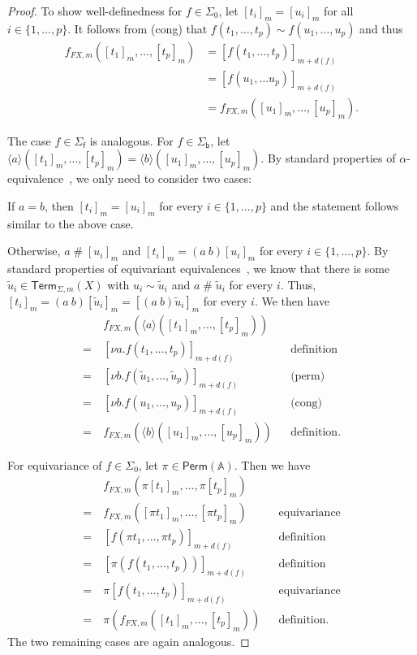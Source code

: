 \documentclass[11pt,a4paper]{amsart}
\newcommand{\Perm}{\mathsf{Perm}(\Names)}
\newcommand{\Term}{\mathsf{Term}}
\newcommand{\sig}{\Sigma}
\newcommand{\sigp}{\Sigma_0}
\newcommand{\sigf}{\Sigma_{\mathsf f}}
\newcommand{\sigb}{\Sigma_{\mathsf b}}
\newcommand{\Names}{\mathbb{A}}
\newcommand{\fresh}{\mathbin{\#}}
\theoremstyle{plain}
\numberwithin{equation}{section}
\newcommand{\+}[1]{\mathcal{#1}\xspace}
\theoremstyle{definition}
\begin{document}
\begin{proof}
    To show well-definedness for \(f \in \sigp\), let \([t_i]_m = [u_i]_m\) for all \(i \in \{1, \ldots, p\}\).
    It follows from (cong) that \(f(t_1, \ldots, t_p) \sim f(u_1, \ldots, u_p)\) and thus
    \begin{align*}
        f_{FX, m}([t_1]_m, \ldots, [t_p]_m)
        &= [f(t_1, \ldots, t_p)]_{m + d(f)} \\
        &= [f(u_1, \ldots u_p)]_{m + d(f)} \\
        &= f_{FX, m}([u_1]_m, \ldots, [u_p]_m).
    \end{align*}

    The case \(f \in \sigf\) is analogous. For \(f \in \sigb\), let
    \(\langle a \rangle ([t_1]_m, \ldots, [t_p]_m) = \langle b
    \rangle ([u_1]_m, \ldots, [u_p]_m)\).  By standard
    properties of $\alpha$-equivalence~\cite{Pitts13}, we only
    need to consider two cases:

    If \(a = b\), then \([t_i]_m = [u_i]_m\) for every \(i \in \{1, \ldots, p\}\) and the statement follows similar to the above case.

    Otherwise, \(a \fresh [u_i]_m\) and \([t_i]_m = (a\ b)[u_i]_m\) for every \(i \in \{1, \ldots, p\}\).
    By standard properties of equivariant equivalences~\cite{Pitts13}, we know that there is some \(\tilde{u}_i \in \Term_{\sig, m}(X)\) with \(u_i \sim \tilde{u}_i\) and \(a \fresh \tilde{u}_i\) for every \(i\).
    Thus, \([t_i]_m = (a\ b)[\tilde{u}_i]_m = [(a\ b)\tilde{u}_i]_m\) for every \(i\).
    We then have
    \begin{align*}
        &f_{FX, m}(\langle a \rangle ([t_1]_m, \ldots, [t_p]_m)) \\
        =~&[\nu a.f(t_1, \ldots, t_p)]_{m + d(f)} && \text{definition} \\
        =~&[\nu b.f(\tilde{u}_1, \ldots, \tilde{u}_p)]_{m + d(f)} && \text{(perm)} \\
        =~&[\nu b.f(u_1, \ldots, u_p)]_{m + d(f)} && \text{(cong)} \\
        =~&f_{FX, m}(\langle b \rangle ([u_1]_m, \ldots, [u_p]_m)) && \text{definition}.
    \end{align*}

    For equivariance of \(f \in \sigp\), let \(\pi \in \Perm\).
    Then we have
    \begin{align*}
        &f_{FX, m}(\pi[t_1]_m, \ldots, \pi[t_p]_m) \\
        =~&f_{FX, m}([\pi t_1]_m, \ldots, [\pi t_p]_m) && \text{equivariance} \\
        =~&[f(\pi t_1, \ldots, \pi t_p)]_{m + d(f)} && \text{definition} \\
        =~&[\pi(f(t_1, \ldots, t_p))]_{m + d(f)} && \text{definition} \\
        =~&\pi[f(t_1, \ldots, t_p)]_{m + d(f)} && \text{equivariance} \\
        =~&\pi(f_{FX, m}([t_1]_m, \ldots, [t_p]_m)) && \text{definition}.
    \end{align*}
    The two remaining cases are again analogous.

\end{proof}
\end{document}
